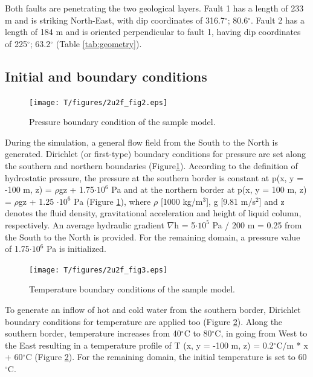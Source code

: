 Both faults are penetrating the two geological layers. Fault 1 has a length of 233 m and is striking North-East, with dip coordinates of 316.7$^\circ{}$; 80.6$^\circ{}$. Fault 2 has a length of 184 m and  is oriented perpendicular to fault 1, having dip coordinates of 225$^\circ{}$; 63.2$^\circ{}$ (Table \ref{tab:geometry}).

\subsection{Initial and boundary conditions}
\begin{figure}[htbp]
    \begin{center}
        \texttt{[image: T/figures/2u2f\_fig2.eps]}
        \caption{Pressure boundary condition of the sample model.}
        \label{fig2}
    \end{center}
\end{figure}
During the simulation, a general flow field from the South to the North is generated. Dirichlet (or first-type) boundary conditions for pressure are set along the southern and northern boundaries (Figure\ref{fig2}). According to the definition of hydrostatic pressure, the pressure at the southern border is constant at p(x, y = -100 m, z) = $\rho{}$gz + 1.75$\cdot10^{6}$ Pa and at the northern border at p(x, y = 100 m, z) = $\rho{}$gz + 1.25 $\cdot10^{6}$ Pa (Figure \ref{fig2}), where $\rho{}$ [1000 kg/m$^{3}$], g [9.81 m/s$^{2}$] and z denotes the fluid density, gravitational acceleration and height of liquid column, respectively. An average hydraulic gradient $\nabla{}$h = 5$\cdot10^{5}$ Pa / 200 m = 0.25 from the South to the North is provided. For the remaining domain, a pressure value of 1.75$\cdot10^{6}$ Pa is initialized. 
\begin{figure}[htbp]
    \begin{center}
        \texttt{[image: T/figures/2u2f\_fig3.eps]}
        \caption{Temperature boundary conditions of the sample model.} 
        \label{fig3}
    \end{center}
\end{figure}

To generate an inflow of hot and cold water from the southern border, Dirichlet boundary conditions for temperature are applied too (Figure \ref{fig3}). Along the southern border, temperature increases from 40$^\circ{}$C to 80$^\circ{}$C, in going from West to the East resulting in a temperature profile of T (x, y = -100 m, z) = 0.2$^\circ{}$C/m * x + 60$^\circ{}$C (Figure \ref{fig3}). For the remaining domain, the initial temperature is set to 60$^\circ{}$C.

